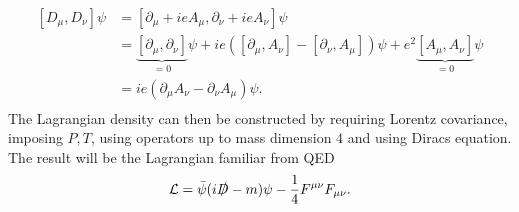 \begin{equation}
	\begin{split}
		[D_\mu,D_\nu]\psi&=[\partial_\mu+ieA_\mu,\partial_\nu+ieA_\nu]\psi\\
		&=\underbrace{[\partial_\mu,\partial_\nu]}_{=0}\psi+ie([\partial_\mu,A_\nu]-[\partial_\nu,A_\mu])\psi+e^2\underbrace{[A_\mu,A_\nu]}_{=0}\psi\\
		&=ie(\partial_\mu A_\nu-\partial_\nu A_\mu)\psi.\\
	\end{split}
\end{equation}  
The Lagrangian density can then be constructed by requiring Lorentz covariance, imposing $P,T$, using operators up to mass dimension $4$ and using Diracs equation. The result will be the Lagrangian familiar from QED
\begin{equation}
	\mathcal{L}=\bar{\psi}(i\slashed D-m)\psi-\frac{1}{4}F^{\mu\nu}F_{\mu\nu}.
\end{equation} 

